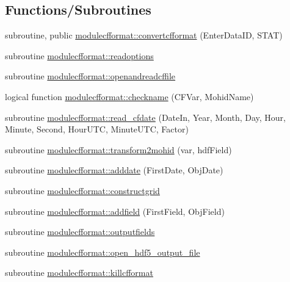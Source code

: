 \subsection*{Functions/\+Subroutines}
\begin{DoxyCompactItemize}
\item 
subroutine, public \mbox{\hyperlink{namespacemodulecfformat_a66da5c204d14d5f914e0226b731d5b00}{modulecfformat\+::convertcfformat}} (Enter\+Data\+ID, S\+T\+AT)
\item 
subroutine \mbox{\hyperlink{namespacemodulecfformat_a127693205be384834843b9bb374985e3}{modulecfformat\+::readoptions}}
\item 
subroutine \mbox{\hyperlink{namespacemodulecfformat_a5052b284bceadda6143b8eb5cfd48d05}{modulecfformat\+::openandreadcffile}}
\item 
logical function \mbox{\hyperlink{namespacemodulecfformat_a63d0a39020a58e43589f5140948d8d58}{modulecfformat\+::checkname}} (C\+F\+Var, Mohid\+Name)
\item 
subroutine \mbox{\hyperlink{namespacemodulecfformat_a76cf49362d3cf1651d95e683370014a6}{modulecfformat\+::read\+\_\+cfdate}} (Date\+In, Year, Month, Day, Hour, Minute, Second, Hour\+U\+TC, Minute\+U\+TC, Factor)
\item 
subroutine \mbox{\hyperlink{namespacemodulecfformat_ada4be4f435cac7bea17a9c4f77f22009}{modulecfformat\+::transform2mohid}} (var, hdf\+Field)
\item 
subroutine \mbox{\hyperlink{namespacemodulecfformat_ad6fa7957e7e1de3c2faa57ac769c05bd}{modulecfformat\+::adddate}} (First\+Date, Obj\+Date)
\item 
subroutine \mbox{\hyperlink{namespacemodulecfformat_a9105e21bd9d021767ea028d72b9a201a}{modulecfformat\+::constructgrid}}
\item 
subroutine \mbox{\hyperlink{namespacemodulecfformat_a86156fe637bfdd6ff49e6bce5f187595}{modulecfformat\+::addfield}} (First\+Field, Obj\+Field)
\item 
subroutine \mbox{\hyperlink{namespacemodulecfformat_a369a14cc96dd6826942c93e6352240db}{modulecfformat\+::outputfields}}
\item 
subroutine \mbox{\hyperlink{namespacemodulecfformat_ac77aa80bb4743d920e0a70e5b278be5d}{modulecfformat\+::open\+\_\+hdf5\+\_\+output\+\_\+file}}
\item 
subroutine \mbox{\hyperlink{namespacemodulecfformat_ac518bd16572e1cf72041996bfd3d1e36}{modulecfformat\+::killcfformat}}
\end{DoxyCompactItemize}
